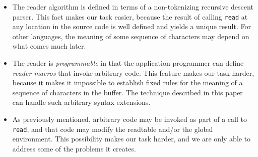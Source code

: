 \begin{itemize}
\item The reader algorithm is defined in terms of a non-tokenizing
  recursive descent parser.  This fact makes our task easier, because
  the result of calling \texttt{read} at any location in the source
  code is well defined and yields a unique result.  For other
  languages, the meaning of some sequence of characters may depend on
  what comes much later.
\item The \commonlisp{} reader is \emph{programmable} in that the
  application programmer can define \emph{reader macros} that invoke
  arbitrary code.  This feature makes our task harder, because it
  makes it impossible to establish fixed rules for the meaning of a
  sequence of characters in the buffer.  The technique described in
  this paper can handle such arbitrary syntax extensions.
\item As previously mentioned, arbitrary \commonlisp{} code may be
  invoked as part of a call to \texttt{read}, and that code may modify
  the readtable and/or the global environment.  This possibility makes
  our task harder, and we are only able to address some of the
  problems it creates.
\end{itemize}
